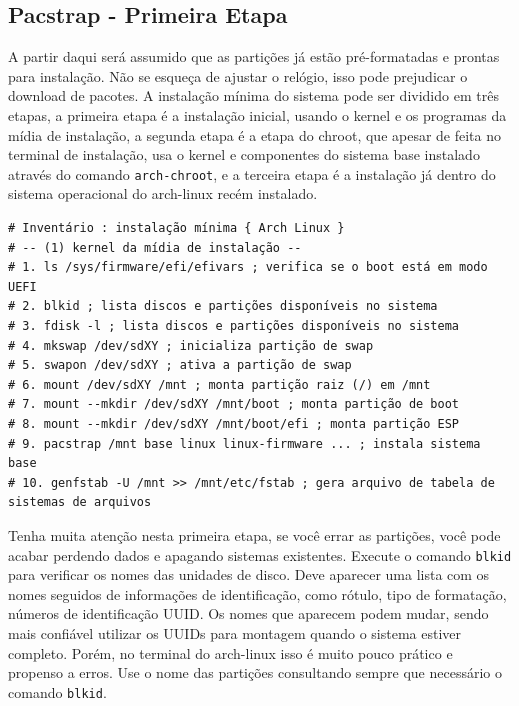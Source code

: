 \documentclass[12pt,a4paper]{article}
\begin{document}
\subsection{Pacstrap - Primeira Etapa}

\hspace{\baselineskip}

A partir daqui será assumido que as partições já estão pré-formatadas e prontas para instalação. Não se esqueça de ajustar o relógio, isso pode prejudicar o download de pacotes. A instalação mínima do sistema pode ser dividido em três etapas, a primeira etapa é a instalação inicial, usando o kernel e os programas da mídia de instalação, a segunda etapa é a etapa do chroot, que apesar de feita no terminal de instalação, usa o kernel e componentes do sistema base instalado através do comando \texttt{arch-chroot}, e a terceira etapa é a instalação já dentro do sistema operacional do arch-linux recém instalado. \\

\begin{lstlisting}
# Inventário : instalação mínima { Arch Linux }
# -- (1) kernel da mídia de instalação --
# 1. ls /sys/firmware/efi/efivars ; verifica se o boot está em modo UEFI
# 2. blkid ; lista discos e partições disponíveis no sistema
# 3. fdisk -l ; lista discos e partições disponíveis no sistema
# 4. mkswap /dev/sdXY ; inicializa partição de swap
# 5. swapon /dev/sdXY ; ativa a partição de swap
# 6. mount /dev/sdXY /mnt ; monta partição raiz (/) em /mnt
# 7. mount --mkdir /dev/sdXY /mnt/boot ; monta partição de boot
# 8. mount --mkdir /dev/sdXY /mnt/boot/efi ; monta partição ESP
# 9. pacstrap /mnt base linux linux-firmware ... ; instala sistema base
# 10. genfstab -U /mnt >> /mnt/etc/fstab ; gera arquivo de tabela de sistemas de arquivos
\end{lstlisting}

\vspace{\baselineskip}

Tenha muita atenção nesta primeira etapa, se você errar as partições, você pode acabar perdendo dados e apagando sistemas existentes. Execute o comando \texttt{blkid} para verificar os nomes das unidades de disco. Deve aparecer uma lista com os nomes seguidos de informações de identificação, como rótulo, tipo de formatação, números de identificação UUID. Os nomes que aparecem podem mudar, sendo mais confiável utilizar os UUIDs para montagem quando o sistema estiver completo. Porém, no terminal do arch-linux isso é muito pouco prático e propenso a erros. Use o nome das partições consultando sempre que necessário o comando \texttt{blkid}.\\
\end{document}
